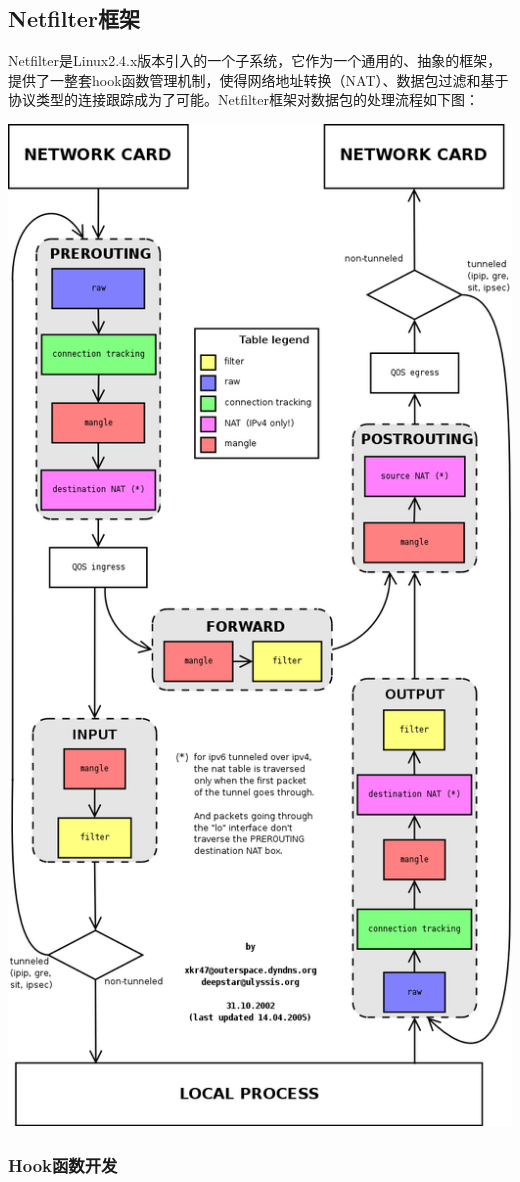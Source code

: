 \documentclass[a4paper,onecolumn,UTF8]{ctexart}
\begin{document}
\subsection{Netfilter框架}
Netfilter是Linux2.4.x版本引入的一个子系统，它作为一个通用的、抽象的框架，提供了一整套hook函数管理机制，使得网络地址转换（NAT）、数据包过滤和基于协议类型的连接跟踪成为了可能。Netfilter框架对数据包的处理流程如下图：
\begin{center}
  \includegraphics[width=.8\textwidth]{./pic/net.png}
\end{center}
\subsubsection{Hook函数开发}
\end{document}
